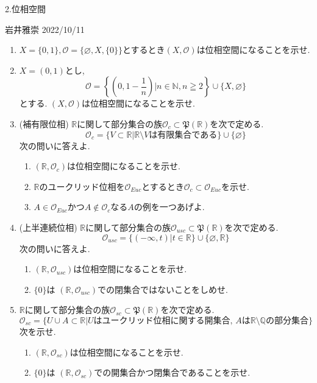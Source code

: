 \documentclass[dvipdfmx,a4paper,11pt]{article}
\newcommand{\R}{\mathbb{R}}
\newcommand{\Q}{\mathbb{Q}}
\newcommand{\N}{\mathbb{N}}
\theoremstyle{definition}
\begin{document}



\begin{center}
{\Large 2.位相空間}
\end{center}

\begin{flushright}
 岩井雅崇 2022/10/11
\end{flushright}
\begin{enumerate}[ label=\textbf{問}2.\arabic*]
\item $X = \{ 0,1\}, \mathscr{O} = \{ \varnothing, X, \{0\} \}$とするとき$(X, \mathscr{O})$は位相空間になることを示せ.

\item $X = (0,1)$とし, 
$$
\mathscr{O} = \left\{ \left(0,1 - \frac{1}{n}\right)| n \in \N, n \geqq 2 \right\} \cup \{ X,\varnothing \}
$$
とする. $(X, \mathscr{O})$は位相空間になることを示せ.

\item (補有限位相)
$\R$に関して部分集合の族$\mathscr{O}_c \subset \mathfrak{P}(\R)$を次で定める.
$$
\mathscr{O}_c = \{V \subset \R | \text{$\R \setminus V$は有限集合である} \} \cup \{  \varnothing  \}
$$
次の問いに答えよ.
	\begin{enumerate}
	\item $(\R,\mathscr{O}_c)$は位相空間になることを示せ.
	\item $\R$のユークリッド位相を$\mathscr{O}_{Euc}$とするとき$\mathscr{O}_c  \subset \mathscr{O}_{Euc}$を示せ. 
	\item $A \in \mathscr{O}_{Euc}$かつ$A \not \in \mathscr{O}_c$なる$A$の例を一つあげよ.
	\end{enumerate}
	
\item (上半連続位相) $\R$に関して部分集合の族$\mathscr{O}_{usc} \subset \mathfrak{P}(\R)$を次で定める.
$$
\mathscr{O}_{usc} = \{(- \infty,t) | t \in \R \} \cup \{  \varnothing , \R \}
$$
次の問いに答えよ.
	\begin{enumerate}
	\item $(\R,\mathscr{O}_{usc})$は位相空間になることを示せ.
	\item $\{ 0\}$は $(\R,\mathscr{O}_{usc})$での閉集合ではないことをしめせ. 
	\end{enumerate}
	
\item $\R$に関して部分集合の族$\mathscr{O}_{sc} \subset \mathfrak{P}(\R)$を次で定める.
$$
\mathscr{O}_{sc}  = \{U \cup A \subset \R | \text{$U$はユークリッド位相に関する開集合, $A$は$\R \setminus \Q$の部分集合}\}
$$
次を示せ.
	\begin{enumerate}
	\item $(\R,\mathscr{O}_{sc} )$は位相空間になることを示せ.
	\item $\{ 0\}$は $(\R,\mathscr{O}_{sc} )$での開集合かつ閉集合であることを示せ.
	\end{enumerate}
	

\end{enumerate}
\end{document}
